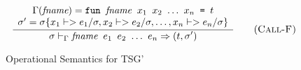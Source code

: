 \documentclass[10pt]{../sigplanconf}
\newcommand{\nfrac}[2]{\frac{\displaystyle{#1}}{\displaystyle{#2}}}
\newcommand{\tagsc}[1]{\tag{\scshape #1}}
\begin{document}
\begin{figure*}
\begin{equation}
  \nfrac{
    \begin{array}{c}
      \Gamma(\textit{fname}) =
        \texttt{fun \textit{\rmfamily fname} $x_1$ $x_2$ $\ldots$ $x_n$ = $t$}
        \\
      \sigma' = \sigma\{x_1 |-> e_1/\sigma, x_2 |-> e_2/\sigma, \ldots, x_n |-> e_n/\sigma\} 
    \end{array}
  }{
    \sigma |-_\Gamma \texttt{\textit{\rmfamily fname} $e_1$ $e_2$ $\ldots$ $e_n$} => (t, \sigma')
  } \tagsc{Call-F}
\end{equation}


\caption{Operational Semantics for TSG'}
\label{fig:semantics}
\end{figure*}
\end{document}
